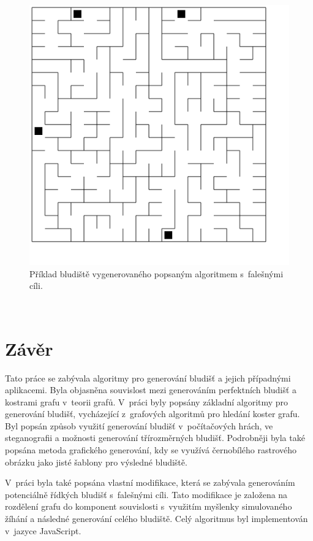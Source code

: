 \documentclass[a4paper,12pt]{article}
\begin{document}
\begin{figure}[h!]
 \centering
 \includegraphics[scale=0.3]{img/canvas.png}
 \caption{Příklad bludiště vygenerovaného popsaným algoritmem s~falešnými cíli.}
 \label{fig:big}
\end{figure}

\newpage
~
\newpage

\section{Závěr}
Tato práce se zabývala algoritmy pro generování bludišť a jejich případnými aplikacemi. Byla objasněna souvislost
mezi generováním perfektních bludišť a kostrami grafu v~teorii grafů. V~práci byly popsány základní algoritmy
pro generování bludišť, vycházející z~grafových algoritmů pro hledání koster grafu. Byl popsán způsob využití
generování bludišť v~počítačových hrách, ve steganografii a možnosti generování třírozměrných bludišť.
Podrobněji byla také popsána metoda grafického generování, kdy se využívá černobílého rastrového
obrázku jako jisté šablony pro výsledné bludiště.

V~práci byla také popsána vlastní modifikace, která se zabývala generováním potenciálně řídkých bludišť s~falešnými cíli.
Tato modifikace je založena na rozdělení grafu do komponent souvislosti s~využitím myšlenky simulovaného žíhání 
a následné generování celého bludiště. Celý algoritmus byl implementován v~jazyce JavaScript.


\newpage
\enlargethispage*{2em}

{}
 
\end{document}
